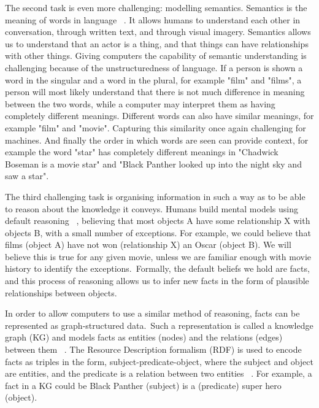 \noindent The second task is even more challenging: modelling semantics. Semantics is the meaning of words in language \unskip~\citep{chomsky1955logical}. It allows humans to understand each other in conversation, through written text, and through visual imagery. Semantics allows us to understand that an actor is a thing, and that things can have relationships with other things. Giving computers the capability of semantic understanding is challenging because of the unstructuredness of language. If a person is shown a word in the singular and a word in the plural, for example "film" and "films", a person will most likely understand that there is not much difference in meaning between the two words, while a computer may interpret them as having completely different meanings. Different words can also have similar meanings, for example "film" and "movie". Capturing this similarity once again challenging for machines. And finally the order in which words are seen can provide context, for example the word "star" has completely different meanings in "Chadwick Boseman is a movie star" and "Black Panther looked up into the night sky and saw a star". \par

\noindent The third challenging task is organising information in such a way as to be able to reason about the knowledge it conveys. Humans build mental models using default reasoning \unskip~\citep{reiter1980logic}, believing that most objects A have some relationship X with objects B, with a small number of exceptions. For example, we could believe that films (object A) have not won (relationship X) an Oscar (object B). We will believe this is true for any given movie, unless we are familiar enough with movie history to identify the exceptions.\ Formally, the default beliefs we hold are facts, and this process of reasoning allows us to infer new facts in the form of plausible relationships between objects. \par

\noindent In order to allow computers to use a similar method of reasoning, facts can be represented as graph-structured data.\ Such a representation is called a knowledge graph (KG) and models facts as entities (nodes) and the relations (edges) between them \unskip~\citep{nickel2015review}. The Resource Description formalism (RDF) is used to encode facts as triples in the form, subject-predicate-object, where the subject and object are entities, and the predicate is a relation between two entities \unskip~\citep{bizer2009dbpedia}. For example, a fact in a KG could be Black Panther (subject) is a (predicate) super hero (object). \par

